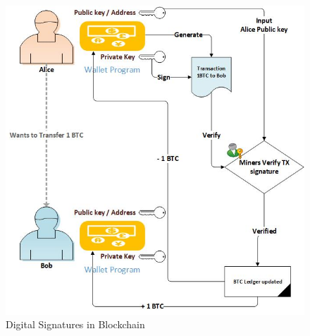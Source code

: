\begin{figure}[h]
	\centering
    \includegraphics[width=160mm,scale=1]{figs/sig}
	\caption{Digital Signatures in Blockchain}
	\label{fig:bc-sig}
\end{figure}
\clearpage

